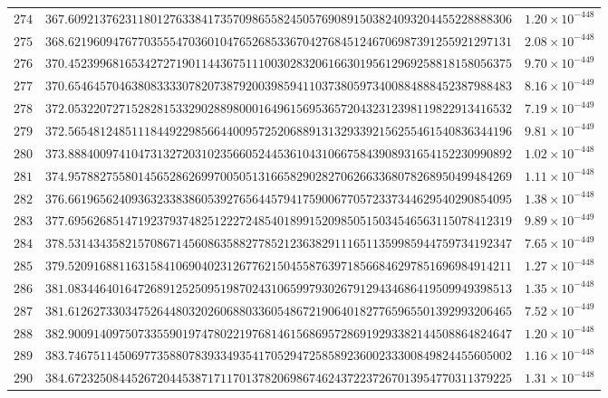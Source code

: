 \documentclass[12pt,reqno]{amsart}
\theoremstyle{remark}
\begin{document}
\begin{longtable}{clc}
$274$ & $367.6092137623118012763384173570986558245057690891503824093204455228888306$ & $1.20\times 10^{-448}$ \\
$275$ & $368.6219609476770355547036010476526853367042768451246706987391255921297131$ & $2.08\times 10^{-448}$ \\
$276$ & $370.4523996816534272719011443675111003028320616630195612969258818158056375$ & $9.70\times 10^{-449}$ \\
$277$ & $370.6546457046380833330782073879200398594110373805973400884888452387988483$ & $8.16\times 10^{-449}$ \\
$278$ & $372.0532207271528281533290288980001649615695365720432312398119822913416532$ & $7.19\times 10^{-449}$ \\
$279$ & $372.5654812485111844922985664400957252068891313293392156255461540836344196$ & $9.81\times 10^{-449}$ \\
$280$ & $373.8884009741047313272031023566052445361043106675843908931654152230990892$ & $1.02\times 10^{-448}$ \\
$281$ & $374.9578827558014565286269970050513166582902827062663368078268950499484269$ & $1.11\times 10^{-448}$ \\
$282$ & $376.6619656240936323383860539276564457941759006770572337344629540290854095$ & $1.38\times 10^{-448}$ \\
$283$ & $377.6956268514719237937482512227248540189915209850515034546563115078412319$ & $9.89\times 10^{-449}$ \\
$284$ & $378.5314343582157086714560863588277852123638291116511359985944759734192347$ & $7.65\times 10^{-449}$ \\
$285$ & $379.5209168811631584106904023126776215045587639718566846297851696984914211$ & $1.27\times 10^{-448}$ \\
$286$ & $381.0834464016472689125250951987024310659979302679129434686419509949398513$ & $1.35\times 10^{-448}$ \\
$287$ & $381.6126273303475264480320260688033605486721906401827765965501392993206465$ & $7.52\times 10^{-449}$ \\
$288$ & $382.9009140975073355901974780221976814615686957286919293382144508864824647$ & $1.20\times 10^{-448}$ \\
$289$ & $383.7467511450697735880783933493541705294725858923600233300849824455605002$ & $1.16\times 10^{-448}$ \\
$290$ & $384.6723250844526720445387171170137820698674624372237267013954770311379225$ & $1.31\times 10^{-448}$ \\

\end{longtable}
\end{document}
